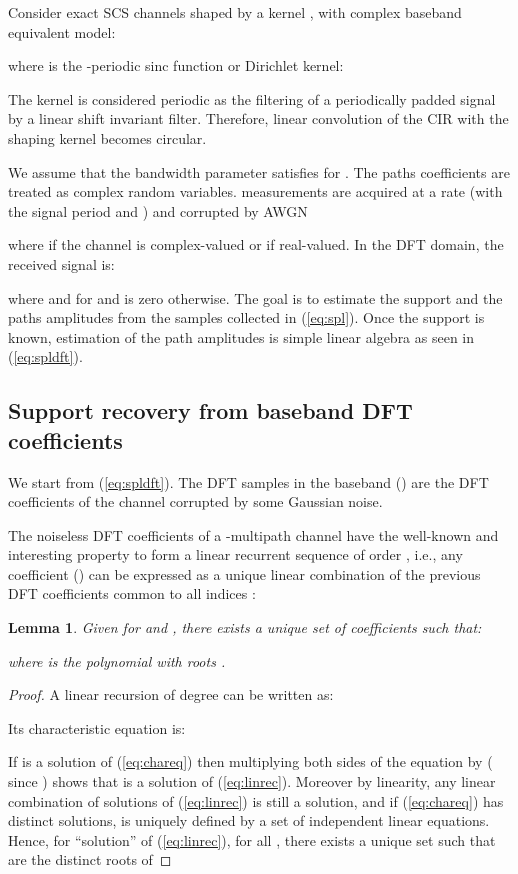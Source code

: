 \documentclass[journal,10pt]{IEEEtran}
\newtheorem{lemma}{Lemma}
\begin{document}
Consider  exact SCS channels shaped by a kernel , with complex baseband equivalent model:

where  is the -periodic sinc function or Dirichlet kernel:


The kernel  is considered periodic as the filtering of a periodically padded signal by a linear shift invariant filter. Therefore, linear convolution of the CIR with the shaping kernel becomes circular.  

We assume that the bandwidth parameter  satisfies  for . The paths coefficients  are treated as complex random variables.  measurements  are acquired at a rate  (with  the signal period and ) and corrupted by AWGN

 where  if the channel is complex-valued or  if real-valued.
In the DFT domain, the received signal is:

where  and  for  and is zero otherwise. The goal is to estimate the support  and the paths amplitudes  from the  samples collected in (\ref{eq:spl}). Once the support is known, estimation of the path amplitudes is simple linear algebra as seen in (\ref{eq:spldft}).

\subsection{Support recovery from baseband DFT coefficients}We start from (\ref{eq:spldft}). The DFT samples  in the baseband () are the DFT coefficients of the channel corrupted by some Gaussian noise.

The noiseless DFT coefficients of a -multipath channel have the well-known and interesting property to form a linear recurrent sequence of order , i.e., any coefficient  () can be expressed as a unique linear combination of the  previous DFT coefficients common to all indices :

\begin{lemma}\label{lemma:recseq}
Given  for  and ,
there exists  a unique set of coefficients  such that:

where  is the polynomial with roots .
\end{lemma}
\begin{proof}
A linear recursion of degree  can be written as:

Its characteristic equation is:

If  is a solution of (\ref{eq:chareq}) then multiplying both sides of the equation by  ( since ) shows that  is a solution of (\ref{eq:linrec}).
Moreover by linearity, any linear combination of solutions of (\ref{eq:linrec}) is still a solution, and if (\ref{eq:chareq}) has  distinct solutions,  is uniquely defined by a set of  independent linear equations.
Hence, for  ``solution'' of (\ref{eq:linrec}),  for all , there exists a unique set  such that  are the  distinct roots of

\end{proof}
\end{document}
